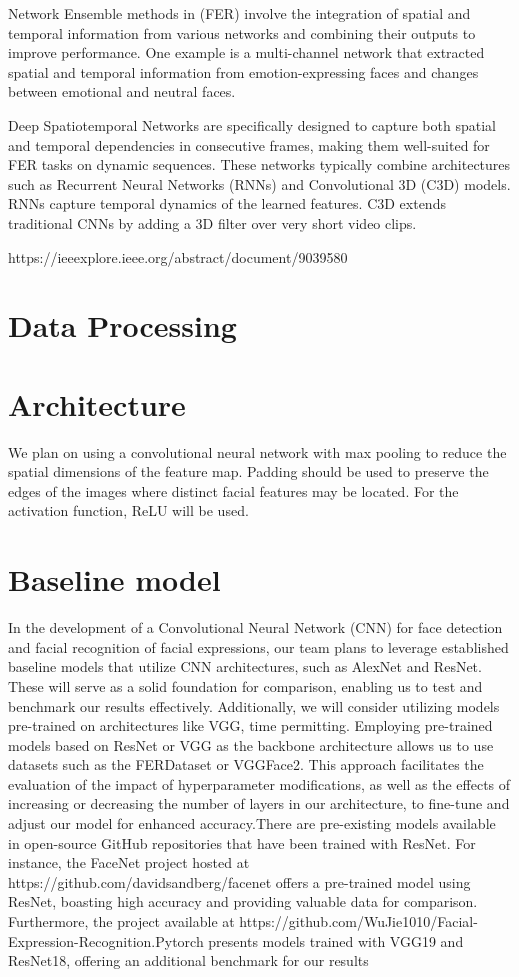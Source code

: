 \documentclass{article} %
\begin{document}
Network Ensemble methods in (FER) involve the integration of spatial and temporal information from various networks and combining their outputs to improve performance. One example is a multi-channel network that extracted spatial and temporal information from emotion-expressing faces and changes between emotional and neutral faces.

Deep Spatiotemporal Networks are specifically designed to capture both spatial and temporal dependencies in consecutive frames, making them well-suited for FER tasks on dynamic sequences. These networks typically combine architectures such as Recurrent Neural Networks (RNNs) and Convolutional 3D (C3D) models. RNNs capture temporal dynamics of the learned features. C3D extends traditional CNNs by adding a 3D filter over very short video clips. 

https://ieeexplore.ieee.org/abstract/document/9039580


\section{Data Processing}

\section{Architecture}
We plan on using a convolutional neural network with max pooling to reduce the spatial dimensions of the feature map. Padding should be used to preserve the edges of the images where distinct facial features may be located. For the activation function, ReLU will be used.

\section{Baseline model}
In the development of a Convolutional Neural Network (CNN) for face detection and facial recognition of facial expressions, our team plans to leverage established baseline models that utilize CNN architectures, such as AlexNet and ResNet. These will serve as a solid foundation for comparison, enabling us to test and benchmark our results effectively. Additionally, we will consider utilizing models pre-trained on architectures like VGG, time permitting. Employing pre-trained models based on ResNet or VGG as the backbone architecture allows us to use datasets such as the FERDataset or VGGFace2. This approach facilitates the evaluation of the impact of hyperparameter modifications, as well as the effects of increasing or decreasing the number of layers in our architecture, to fine-tune and adjust our model for enhanced accuracy.There are pre-existing models available in open-source GitHub repositories that have been trained with ResNet. For instance, the FaceNet project hosted at https://github.com/davidsandberg/facenet offers a pre-trained model using ResNet, boasting high accuracy and providing valuable data for comparison. Furthermore, the project available at https://github.com/WuJie1010/Facial-Expression-Recognition.Pytorch presents models trained with VGG19 and ResNet18, offering an additional benchmark for our results
\end{document}
